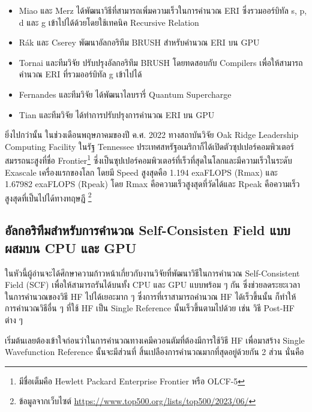 \begin{itemize}[topsep=0pt,noitemsep]
  \item Miao และ Merz ได้พัฒนาวิธีที่สามารถเพิ่มความเร็วในการคำนวณ ERI ซึ่งรวมออร์บิทัล s, p, d\autocite{miao2013} และ g
        เข้าไปได้ด้วยโดยใช้เทคนิค Recursive Relation\autocite{miao2015}

  \item Rák และ Cserey พัฒนาอัลกอริทึม BRUSH สำหรับคำนวณ ERI บน GPU\autocite{rak2015}

  \item Tornai และทีมวิจัย ปรับปรุงอัลกอริทึม BRUSH โดยทดสอบกับ Compilers เพื่อให้สามารถคำนวณ ERI ที่รวมออร์บิทัล g เข้าไปได้%
        \autocite{tornai2019}

  \item Fernandes และทีมวิจัย ได้พัฒนาไลบรารี่ Quantum Supercharge\autocite{fernandes2015}

  \item Tian และทีมวิจัย ได้ทำการปรับปรุงการคำนวณ ERI บน GPU\autocite{tian2021}
\end{itemize}

ยิ่งไปกว่านั้น ในช่วงเดือนพฤษภาคมของปี ค.ศ. 2022 ทางสถาบันวิจัย Oak Ridge Leadership Computing Facility ในรัฐ Tennessee
ประเทศสหรัฐอเมริกาก็ได้เปิดตัวซุปเปอร์คอมพิวเตอร์สมรรถนะสูงที่ชื่อ Frontier\footnote{มีชื่อเต็มคือ Hewlett Packard Enterprise Frontier
  หรือ OLCF-5} ซึ่งเป็นซุปเปอร์คอมพิวเตอร์ที่เร็วที่สุดในโลกและมีความเร็วในระดับ Exascale เครื่องแรกของโลก โดยมี Speed สูงสุดคือ 1.194
exaFLOPS (Rmax) และ 1.67982 exaFLOPS (Rpeak) โดย Rmax คือความเร็วสูงสุดที่วัดได้และ Rpeak คือความเร็วสูงสุดที่เป็นไปได้ทางทฤษฎี%
\footnote{ข้อมูลจากเว็บไซต์ \url{https://www.top500.org/lists/top500/2023/06/}}

\subsection{อัลกอริทึมสำหรับการคำนวณ Self-Consisten Field แบบผสมบน CPU และ GPU}

ในหัวนี้ผู้อ่านจะได้ศึกษาความก้าวหน้าเกี่ยวกับงานวิจัยที่พัฒนาวิธีในการคำนวณ Self-Consistent Field (SCF) เพื่อให้สามารถรันได้บนทั้ง CPU
และ GPU แบบพร้อม ๆ กัน ซึ่งช่วยลดระยะเวลาในการคำนวณของวิธี HF ไปได้เยอะมาก ๆ ซึ่งการที่เราสามารถคำนวณ HF ได้เร็วขึ้นนั้น
ก็ทำให้การคำนวณวิธีอื่น ๆ ที่ใช้ HF เป็น Single Reference นั้นเร็วขึ้นตามไปด้วย เช่น วิธี Post-HF ต่าง ๆ

เริ่มต้นเลยต้องเข้าใจก่อนว่าในการคำนวณทางเคมีควอนตัมที่ต้องมีการใช้วิธี HF เพื่อมาสร้าง Single Wavefunction Reference นั้นจะมีส่วนที่%
สิ้นเปลืองการคำนวณมากที่สุดอยู่ด้วยกัน 2 ส่วน นั่นคือ


